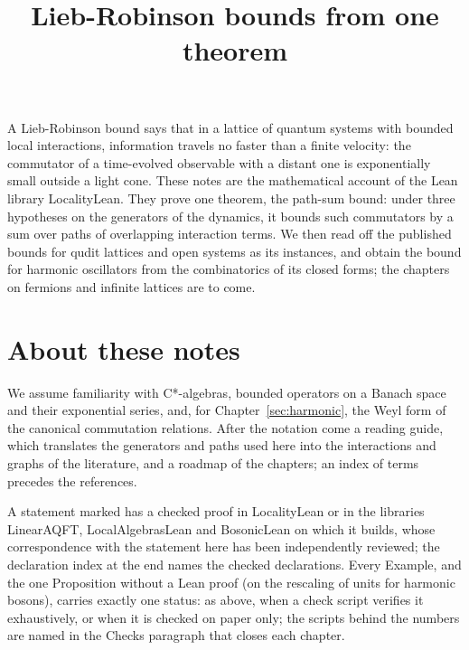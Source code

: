 \documentclass[11pt]{article}
\title{Lieb-Robinson bounds from one theorem}
\author{}
\date{}
\numberwithin{equation}{section}
\newcommand{\motiv}[1]{#1}
\theoremstyle{definition}
\theoremstyle{remark}
\theoremstyle{plain}
\newcommand{\vet}[1]{#1}
\newcommand{\vetnew}[1]{#1}
\newcommand{\revs}[1]{#1}
\begin{document}
\LLEnableLinks
\sloppy
\maketitle
\vspace{-2em}
\noindent\motiv{\vet{A Lieb-Robinson bound says that in a lattice of quantum systems with bounded
local interactions, information travels no faster than a finite velocity: the commutator of a
time-evolved observable with a distant one is exponentially small outside a light cone. These
notes are the mathematical account of the Lean library LocalityLean. \vetnew{They prove one
theorem, the path-sum bound: under three hypotheses on the generators of the dynamics, it
bounds such commutators by a sum over paths of overlapping interaction terms. We then read off
the published bounds for qudit lattices and open systems as its instances, \revs{and obtain the
bound for harmonic oscillators from the combinatorics of its closed forms};
the chapters on fermions and infinite lattices are to come.}}}

{\small\tableofcontents}
\medskip

\section*{About these notes}
\noindent\revs{We assume familiarity with C*-algebras, bounded operators on a Banach space and
their exponential series, and, for Chapter~\ref{sec:harmonic}, the Weyl form of the canonical
commutation relations. After the notation come a reading guide, which translates the generators
and paths used here into the interactions and graphs of the literature, and a roadmap of the
chapters; an index of terms precedes the references.}

\medskip
\noindent\vetnew{A statement marked \LLLeanTag{} has a checked proof in LocalityLean or in the libraries
\mbox{LinearAQFT}, \mbox{LocalAlgebrasLean} and \mbox{BosonicLean} on which it builds, whose correspondence with the
statement here has been independently reviewed; the declaration index at the end names the
checked declarations. Every Example, and the one Proposition without a Lean proof (on the rescaling of
units for harmonic bosons), carries exactly one status: \LLLeanTag{} as above,
\LLScriptTag{} when a check script verifies it exhaustively, or \LLPaperTag{} when it is checked
on paper only}\revs{; the scripts behind the numbers are named in the Checks paragraph that
closes each chapter}.
\end{document}
